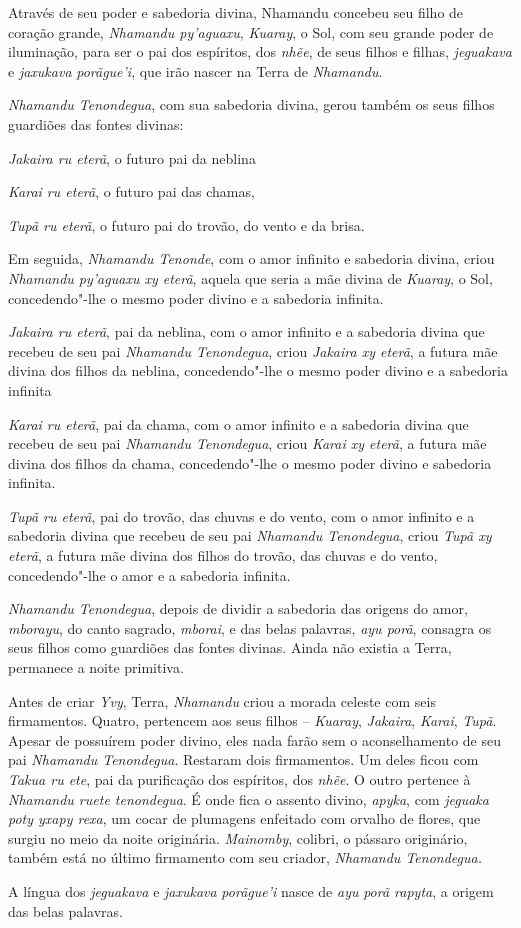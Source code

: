  

 

Através de seu poder e sabedoria divina, Nhamandu concebeu seu filho de
coração grande, \emph{Nhamandu py'aguaxu}, \emph{Kuaray}, o Sol, com seu
grande poder de iluminação, para ser o pai dos espíritos, dos
\emph{nhẽe}, de seus filhos e filhas, \emph{jeguakava} e \emph{jaxukava}
\emph{porãgue'i}, que irão nascer na Terra de \emph{Nhamandu}.

\emph{Nhamandu Tenondegua}, com sua sabedoria divina, gerou também os
seus filhos guardiões das fontes divinas:

\emph{Jakaira ru eterã}, o futuro pai da neblina

\emph{Karai ru eterã}, o futuro pai das chamas,

\emph{Tupã ru eterã}, o futuro pai do trovão, do vento e da brisa.

Em seguida, \emph{Nhamandu Tenonde}, com o amor infinito e sabedoria
divina, criou \emph{Nhamandu py'aguaxu xy eterã}, aquela que seria a mãe
divina de \emph{Kuaray}, o Sol, concedendo"-lhe o mesmo poder divino e a
sabedoria infinita.

\emph{Jakaira ru eterã}, pai da neblina, com o amor infinito e a
sabedoria divina que recebeu de seu pai \emph{Nhamandu Tenondegua},
criou \emph{Jakaira xy eterã}, a futura mãe divina dos filhos da
neblina, concedendo"-lhe o mesmo poder divino e a sabedoria infinita

\emph{Karai ru eterã}, pai da chama, com o amor infinito e a sabedoria
divina que recebeu de seu pai \emph{Nhamandu Tenondegua}, criou
\emph{Karai xy eterã}, a futura mãe divina dos filhos da chama,
concedendo"-lhe o mesmo poder divino e sabedoria infinita.

\emph{Tupã ru eterã}, pai do trovão, das chuvas e do vento, com o amor
infinito e a sabedoria divina que recebeu de seu pai \emph{Nhamandu
Tenondegua}, criou \emph{Tupã xy eterã}, a futura mãe divina dos filhos
do trovão, das chuvas e do vento, concedendo"-lhe o amor e a sabedoria
infinita.

\emph{Nhamandu Tenondegua}, depois de dividir a sabedoria das origens do
amor, \emph{mborayu}, do canto sagrado, \emph{mborai}, e das belas
palavras, \emph{ayu porã}, consagra os seus filhos como guardiões das
fontes divinas. Ainda não existia a Terra, permanece a noite primitiva.

Antes de criar \emph{Yvy}, Terra, \emph{Nhamandu} criou a morada celeste
com seis firmamentos. Quatro, pertencem aos seus filhos --
\emph{Kuaray}, \emph{Jakaira}, \emph{Karai}, \emph{Tupã}. Apesar de
possuírem poder divino, eles nada farão sem o aconselhamento de seu pai
\emph{Nhamandu Tenondegua}. Restaram dois firmamentos. Um deles ficou
com \emph{Takua ru ete}, pai da purificação dos espíritos, dos
\emph{nhẽe}. O outro pertence à \emph{Nhamandu ruete tenondegua}. É onde
fica o assento divino, \emph{apyka}, com \emph{jeguaka poty yxapy rexa},
um cocar de plumagens enfeitado com orvalho de flores, que surgiu no
meio da noite originária. \emph{Mainomby}, colibri, o pássaro
originário, também está no último firmamento com seu criador,
\emph{Nhamandu Tenondegua.} 

A língua dos \emph{jeguakava} e \emph{jaxukava} \emph{porãgue'i} nasce
de \emph{ayu} \emph{porã rapyta}, a origem das belas palavras.


 
